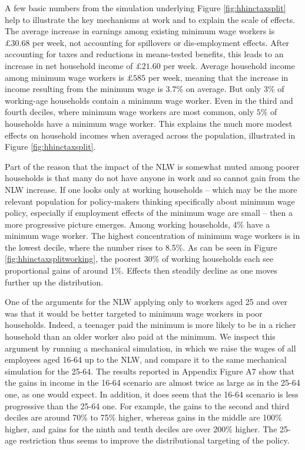 A few basic numbers from the simulation underlying Figure \ref{fig:hhinctaxsplit} help to illustrate the key mechanisms at work and to explain the scale of effects. The average increase in earnings among existing minimum wage workers is $\pounds 30.68$ per week, not accounting for spillovers or dis-employment effects. After accounting for taxes and reductions in means-tested benefits, this leads to an increase in net household income of $\pounds 21.60$ per week. Average household income among minimum wage workers is $\pounds 585$ per week, meaning that the increase in income resulting from the minimum wage is $3.7\%$ on average. But only $3\%$ of working-age households contain a minimum wage worker. Even in the third and fourth deciles, where minimum wage workers are most common, only $5\%$ of households have a minimum wage worker. This explains the much more modest effects on household incomes when averaged across the population, illustrated in Figure \ref{fig:hhinctaxsplit}.


Part of the reason that the impact of the NLW is somewhat muted among poorer households is that many do not have anyone in work and so cannot gain from the NLW increase. If one looks only at working households -- which may be the more relevant population for policy-makers thinking specifically about minimum wage policy, especially if employment effects of the minimum wage are small -- then a more progressive picture emerges. Among working households, 4\% have a minimum wage worker. The highest concentration of minimum wage workers is in the lowest decile, where the number rises to 8.5\%. As can be seen in Figure \ref{fig:hhinctaxsplitworking}, the poorest 30\% of working households each see proportional gains of around 1\%. Effects then steadily decline as one moves further up the distribution.


One of the arguments for the NLW applying only to workers aged 25 and over was that it would be better targeted to minimum wage workers in poor households. Indeed, a teenager paid the minimum is more likely to be in a richer household than an older worker also paid at the minimum. We inspect this argument by running a mechanical simulation, in which we raise the wages of all employees aged 16-64 up to the NLW, and compare it to the same mechanical simulation for the 25-64. The results reported in Appendix Figure A7 show that the gains in income in the 16-64 scenario are almost twice as large as in the 25-64 one, as one would expect. In addition, it does seem that the 16-64 scenario is less progressive than the 25-64 one. For example, the gains to the second and third deciles are around 70\% to 75\% higher, whereas gains in the middle are 100\% higher, and gains for the ninth and tenth deciles are over 200\% higher. The 25-age restriction thus seems to improve the distributional targeting of the policy.


